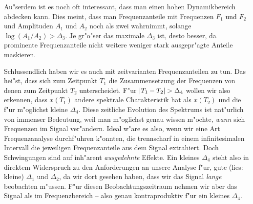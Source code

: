 Au"serdem ist es noch oft interessant, dass man einen hohen Dynamikbereich abdecken kann.
Dies meint, dass man Frequenzanteile mit Frequenzen $F_1$ und $F_2$ und Amplituden $A_1$ und $A_2$ noch als zwei wahrnimmt, solange $\log(A_1/A_2) > \Delta_3$. 
Je gr"o"ser das maximale $\Delta_3$ ist, desto besser, da prominente Frequenzanteile nicht weitere weniger stark ausgepr"agte Anteile maskieren.

Schlussendlich haben wir es auch mit zeitvarianten Frequenzanteilen zu tun.
Das hei"st, dass sich zum Zeitpunkt $T_1$ die Zusammensetzung der Frequenzen von denen zum Zeitpunkt $T_2$ unterscheidet.
F"ur ${\left| T_1 - T_2 \right|} > \Delta_4$ wollen wir also erkennen, dass $x(T_1)$ andere spektrale Charakteristik hat als $x(T_2)$ und die f"ur m"oglichst kleine $\Delta_4$.
Diese zeitliche Evolution des Spektrums ist nat"urlich von immenser Bedeutung, weil man m"oglichst genau wissen m"ochte, \emph{wann} sich Frequenzen im Signal ver"andern.
Ideal w"are es also, wenn wir eine Art  Frequenzanalyse durchf"uhren k"onnten, die trennscharf in einem infinitesimalen Intervall die jeweiligen Frequenzanteile aus dem Signal extrahiert.
Doch Schwingungen sind auf inh"arent \emph{ausgedehnte} Effekte.
Ein kleines $\Delta_4$ steht also in direktem Widerspruch zu den Anforderungen an unsere Analyse f"ur, gute (lies: kleine) $\Delta_1$ und $\Delta_2$, da wir dort gesehen haben, dass wir das Signal \emph{lange} beobachten m"ussen.
F"ur diesen Beobachtungszeitraum nehmen wir aber das Signal als  im Frequenzbereich -- also genau kontraproduktiv f"ur ein kleines $\Delta_4$.
